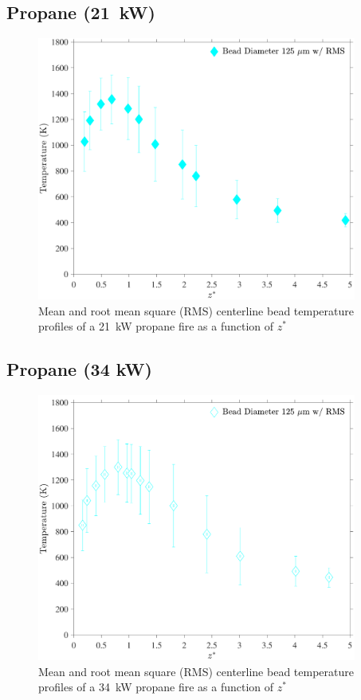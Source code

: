 \documentclass[12pt]{article}
\begin{document}
\pagebreak

\subsection{Propane (21~kW)}
\label{ssec:Propane20KW_Bead_Temp}
\begin{figure}[!h]
	\centering
\includegraphics[width=10.5cm,keepaspectratio]{Propane 21KW_Bead_Temperature.pdf}
	\caption[Mean and RMS centerline bead temperature profile of a 21~kW propane fire]{Mean and root mean square (RMS) centerline bead temperature profiles of a 21~kW propane fire as a function of $z^*$}
	\label{fig:Propane20KW_Bead_Temp}
\end{figure}

\pagebreak

\subsection{Propane (34 kW)}
\label{ssec:Propane34KW_Bead_Temp}
\begin{figure}[!h]
	\centering
\includegraphics[width=10.5cm,keepaspectratio]{Propane 34KW_Bead_Temperature.pdf}
	\caption[Mean and RMS centerline bead temperature profile of a 34~kW propane fire]{Mean and root mean square (RMS) centerline bead temperature profiles of a 34~kW propane fire as a function of $z^*$}
	\label{fig:Propane34KW_Bead_Temp}
\end{figure}
\end{document}

